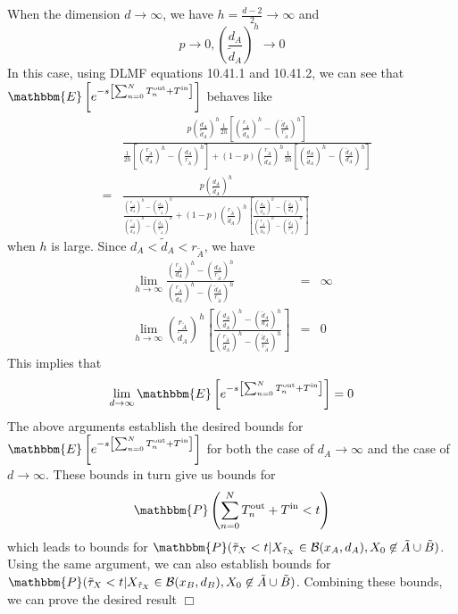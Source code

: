 \documentclass[english, aip, jcp, priprint, graphicx]{revtex4-1}
\newcommand{\nin}{\not\in}
\newcommand{\tmop}[1]{\ensuremath{\operatorname{#1}}}
\theoremstyle{plain}
\theoremstyle{definition}
\theoremstyle{plain}
\begin{document}
When the dimension $d \rightarrow \infty$, we have $h = \frac{d - 2}{2}
\rightarrow \infty$ and
\[ p \rightarrow 0, \left( \frac{d_A}{\tilde{d}_A} \right)^h \rightarrow 0 \]
In this case, using DLMF\cite{noauthor_undated-ti} equations 10.41.1 and 10.41.2, we can see that
$\mathbbm{E} \left[ e^{- s \left[ \sum_{n = 0}^N T_n^{\tmop{out}} +
T^{\tmop{in}} \right]} \right]$ behaves like
\begin{eqnarray*}
&  & \frac{p \left( \frac{d_A}{\tilde{d}_A} \right)^h \frac{1}{2 h} \left[
\left( \frac{r_{\tilde{A}}}{\tilde{d}_A} \right)^h - \left(
\frac{\tilde{d}_A}{r_{\tilde{A}}} \right)^h \right]}{\frac{1}{2 h} \left[
\left( \frac{r_{\tilde{A}}}{d_A} \right)^h - \left(
\frac{d_A}{r_{\tilde{A}}} \right)^h \right] + (1 - p) \left(
\frac{r_{\tilde{A}}}{\tilde{d}_A} \right)^h \frac{1}{2 h} \left[ \left(
\frac{d_A}{\tilde{d}_A} \right)^h - \left( \frac{\tilde{d}_A}{d_A} \right)^h
\right]}\\
& = & \frac{p \left( \frac{d_A}{\tilde{d}_A} \right)^h}{\frac{\left(
\frac{r_{\tilde{A}}}{d_A} \right)^h - \left( \frac{d_A}{r_{\tilde{A}}}
\right)^h}{\left( \frac{r_{\tilde{A}}}{\tilde{d}_A} \right)^h - \left(
\frac{\tilde{d}_A}{r_{\tilde{A}}} \right)^h} + (1 - p) \left(
\frac{r_{\tilde{A}}}{\tilde{d}_A} \right)^h \left[ \frac{\left(
\frac{d_A}{\tilde{d}_A} \right)^h - \left( \frac{\tilde{d}_A}{d_A}
\right)^h}{\left( \frac{r_{\tilde{A}}}{\tilde{d}_A} \right)^h - \left(
\frac{\tilde{d}_A}{r_{\tilde{A}}} \right)^h} \right]}
\end{eqnarray*}
when $h$ is large. Since $d_A < \tilde{d}_A < r_{\tilde{A}}$, we have
\begin{eqnarray*}
\lim_{h \rightarrow \infty} \frac{\left( \frac{r_{\tilde{A}}}{d_A} \right)^h
- \left( \frac{d_A}{r_{\tilde{A}}} \right)^h}{\left(
\frac{r_{\tilde{A}}}{\tilde{d}_A} \right)^h - \left(
\frac{\tilde{d}_A}{r_{\tilde{A}}} \right)^h} & = & \infty\\
\lim_{h \rightarrow \infty} \left( \frac{r_{\tilde{A}}}{\tilde{d}_A}
\right)^h \left[ \frac{\left( \frac{d_A}{\tilde{d}_A} \right)^h - \left(
\frac{\tilde{d}_A}{d_A} \right)^h}{\left( \frac{r_{\tilde{A}}}{\tilde{d}_A}
\right)^h - \left( \frac{\tilde{d}_A}{r_{\tilde{A}}} \right)^h} \right] & =
& 0
\end{eqnarray*}
This implies that
\[ \lim_{d \rightarrow \infty} \mathbbm{E} \left[ e^{- s \left[ \sum_{n = 0}^N
T_n^{\tmop{out}} + T^{\tmop{in}} \right]} \right] = 0 \]
The above arguments establish the desired bounds for $\mathbbm{E} \left[ e^{-
s \left[ \sum_{n = 0}^N T_n^{\tmop{out}} + T^{\tmop{in}} \right]} \right]$ for
both the case of $d_A \rightarrow \infty$ and the case of $d \rightarrow
\infty$. These bounds in turn give us bounds for
\[ \mathbbm{P} \left( \sum_{n = 0}^N T_n^{\tmop{out}} + T^{\tmop{in}} < t
\right) \]
which leads to bounds for $ \mathbbm{P} (\tilde{\tau}_X < t|X_{\tilde{\tau}_X} \in \mathcal{B} (x_A, d_A), X_0 \nin \tilde{A} \cup \tilde{B}) $. 
Using the same argument, we can also establish bounds for
$ \mathbbm{P} (\tilde{\tau}_X < t|X_{\tilde{\tau}_X} \in \mathcal{B} (x_B,
d_B), X_0 \nin \tilde{A} \cup \tilde{B})$. 
Combining these bounds, we can prove the desired result
\hspace*{\fill}$\Box$\medskip
\end{document}
